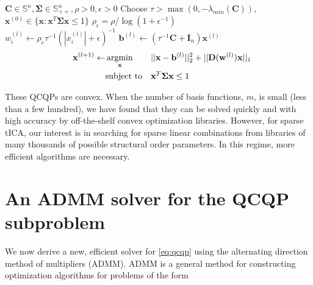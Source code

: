 \documentclass[aip, jcp, reprint, nolinenumbers, twocolumn, nobalancelastpage, nofootinbib]{revtex4-1}
\begin{document}
\begin{algorithm}[H]
\begin{algorithmic}
\Require $\mathbf{C} \in \mathbb{S}^n, \mathbf{\Sigma} \in \mathbb{S}_{++}^n, \rho>0, \epsilon>0$
\State Choose $\tau > \max(0, -\lambda_{min}(\mathbf{C}))$, $\mathbf{x}^{(0)} \in \{\mathbf{x} : \mathbf{x}^T \mathbf{\Sigma} \mathbf{x} \leq 1 \}$
\State $\rho_\epsilon = \rho / \log(1+\epsilon^{-1})$
 \\
\State $w_i^{(l)} \gets \rho_e\tau^{-1}  (|x_i^{(l)}| + \epsilon)^{-1}$
\State $\mathbf{b}^{(l)} \gets (\tau^{-1} \mathbf{C} + \mathbf{I}_n) \mathbf{x}^{(l)}$
\begin{align}
\;\;\;\mathbf{x}^{(l+1)} \gets &\operatornamewithlimits{argmin}_\mathbf{x} &&||\mathbf{x} - \mathbf{b}^{(l)}||_2^2 + ||\mathbf{D}(\mathbf{w}^{(l)}) \mathbf{x}||_1 \label{eq:qcqp} \\
&\text{subject to}&  &\mathbf{x}^T \mathbf{\Sigma} \mathbf{x} \leq 1 \nonumber
\end{align}
\EndWhile
\caption{\label{alg:1} \citet{sriperumbudur2011majorization}}
\end{algorithmic}
\end{algorithm}

These QCQPs are convex. When the number of basis functions, $m$, is small (less than a few hundred), we have found that they can be solved quickly and with high accuracy by off-the-shelf convex optimization libraries. However, for sparse tICA, our interest is in searching for sparse linear combinations from libraries of many thousands of possible structural order parameters. In this regime, more efficient algorithms are necessary.

\section{An ADMM solver for the QCQP subproblem}

We now derive a new, efficient solver for \cref{eq:qcqp} using the alternating direction method of multipliers (ADMM). ADMM is a general method for constructing optimization algorithms for problems of the form
\end{document}
